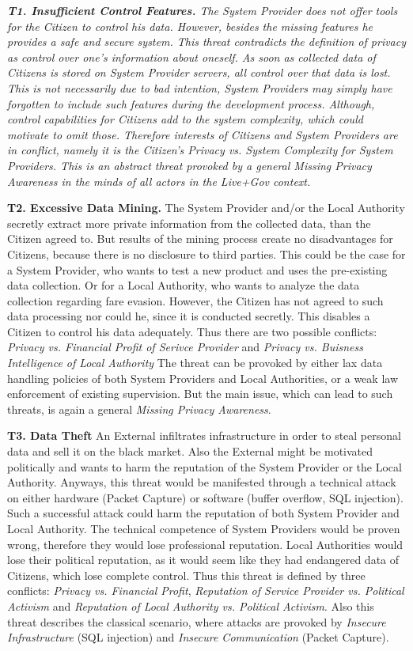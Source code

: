 \documentclass[runningheads,a4paper]{llncs}
\newenvironment{LGContent}
{ \par\color{blue} \it \small }
{ \par }
\begin{document}
\begin{LGContent}
\textbf{T1. Insufficient Control Features.}
The System Provider does not offer tools for the Citizen to control his data.
However, besides the missing features he provides a safe and secure system.
This threat contradicts the definition of privacy as control over one's information about oneself.
As soon as collected data of Citizens is stored on System Provider servers, all control over that data is lost.
This is not necessarily due to bad intention, System Providers may simply have forgotten to include such features during the development process.
Although, control capabilities for Citizens add to the system complexity, which could motivate to omit those. 
Therefore interests of Citizens and System Providers are in conflict, namely it is the Citizen's \textit{Privacy vs. System Complexity} for System Providers.
This is an abstract threat provoked by a general \textit{Missing Privacy Awareness} in the minds of all actors in the Live+Gov context.

\textbf{T2. Excessive Data Mining.}
The System Provider and/or the Local Authority secretly extract more private information from the collected data, than the Citizen agreed to.
But results of the mining process create no disadvantages for Citizens, because there is no disclosure to third parties.
This could be the case for a System Provider, who wants to test a new product and uses the pre-existing data collection.
Or for a Local Authority, who wants to analyze the data collection regarding fare evasion.
However, the Citizen has not agreed to such data processing nor could he, since it is conducted secretly.
This disables a Citizen to control his data adequately.
Thus there are two possible conflicts: \textit{Privacy vs. Financial Profit of Serivce Provider} and  \textit{Privacy vs. Buisness Intelligence of Local Authority}
The threat can be provoked by either lax data handling policies of both System Providers and Local Authorities, or a weak law enforcement of existing supervision.
But the main issue, which can lead to such threats, is again a general \textit{Missing Privacy Awareness}.

\textbf{T3. Data Theft}
An External infiltrates infrastructure in order to steal personal data and sell it on the black market.
Also the External might be motivated politically and wants to harm the reputation of the System Provider or the Local Authority.
Anyways, this threat would be manifested through a technical attack on either hardware (Packet Capture) or software (buffer overflow, SQL injection).
Such a successful attack could harm the reputation of both System Provider and Local Authority.
The technical competence of System Providers would be proven wrong, therefore they would lose professional reputation.
Local Authorities would lose their political reputation, as it would seem like they had endangered data of Citizens, which lose complete control.
Thus this threat is defined by three conflicts: \textit{Privacy vs. Financial Profit}, \textit{Reputation of Service Provider vs. Political Activism} and \textit{Reputation of Local Authority vs. Political Activism}.
Also this threat describes the classical scenario, where attacks are provoked by \textit{Insecure Infrastructure} (SQL injection) and \textit{Insecure Communication} (Packet Capture).


\end{LGContent}
\end{document}
